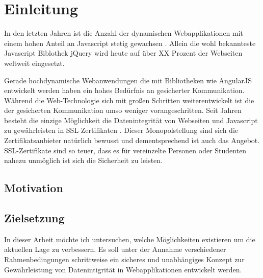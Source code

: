 
\section{Einleitung}





In den letzten Jahren ist die Anzahl der dynamischen Webapplikationen mit einem hohen Anteil an Javascript stetig gewachsen \quelle.
Allein die wohl bekannteste Javascript Biblothek jQuery \urlref wird heute auf über XX Prozent der Webseiten weltweit eingesetzt. \quelle

Gerade hochdynamische Webanwendungen die mit Bibliotheken wie AngularJS \urlref entwickelt werden haben ein hohes Bedürfnis an gesicherter Kommunikation.
Während die Web-Technologie sich mit großen Schritten weiterentwickelt ist die der gesicherten Kommunikation umso weniger vorangeschritten.
Seit Jahren besteht die einzige Möglichkeit die Datenintegrität von Webseiten und Javascript zu gewährleisten in SSL Zertifikaten \iref.
Dieser Monopolstellung sind sich die Zertifikatsanbieter natürlich bewusst und dementsprechend ist auch das Angebot.
SSL-Zertifikate sind so teuer, dass es für vereinzelte Personen oder Studenten nahezu unmöglich ist sich die Sicherheit zu leisten.


\subsection{Motivation}
\tbd


\subsection{Zielsetzung}

In dieser Arbeit möchte ich untersuchen, welche Möglichkeiten existieren um die aktuellen Lage zu verbessern. Es soll unter der Annahme verschiedener Rahmenbedingungen schrittweise ein sicheres und unabhängiges Konzept zur Gewährleistung von Datenintigrität in Webapplikationen entwickelt werden.

